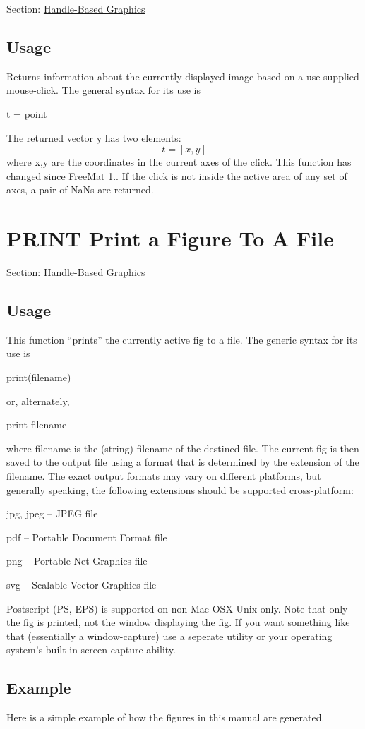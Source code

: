 Section\-: \hyperlink{sec_handle}{Handle-\/\-Based Graphics} \hypertarget{vtkwidgets_vtkxyplotwidget_Usage}{}\subsection{Usage}\label{vtkwidgets_vtkxyplotwidget_Usage}
Returns information about the currently displayed image based on a use supplied mouse-\/click. The general syntax for its use is \begin{DoxyVerb}   t = point
\end{DoxyVerb}
 The returned vector {\ttfamily y} has two elements\-: \[ t = [x,y] \] where {\ttfamily x,y} are the coordinates in the current axes of the click. This function has changed since Free\-Mat 1.. If the click is not inside the active area of any set of axes, a pair of Na\-Ns are returned. \hypertarget{handle_print}{}\section{P\-R\-I\-N\-T Print a Figure To A File}\label{handle_print}
Section\-: \hyperlink{sec_handle}{Handle-\/\-Based Graphics} \hypertarget{vtkwidgets_vtkxyplotwidget_Usage}{}\subsection{Usage}\label{vtkwidgets_vtkxyplotwidget_Usage}
This function ``prints'' the currently active fig to a file. The generic syntax for its use is \begin{DoxyVerb}  print(filename)
\end{DoxyVerb}
 or, alternately, \begin{DoxyVerb}  print filename
\end{DoxyVerb}
 where {\ttfamily filename} is the (string) filename of the destined file. The current fig is then saved to the output file using a format that is determined by the extension of the filename. The exact output formats may vary on different platforms, but generally speaking, the following extensions should be supported cross-\/platform\-: 
\begin{DoxyItemize}
\item {\ttfamily jpg}, {\ttfamily jpeg} -- J\-P\-E\-G file  
\item {\ttfamily pdf} -- Portable Document Format file  
\item {\ttfamily png} -- Portable Net Graphics file  
\item {\ttfamily svg} -- Scalable Vector Graphics file  
\end{DoxyItemize}Postscript (P\-S, E\-P\-S) is supported on non-\/\-Mac-\/\-O\-S\-X Unix only. Note that only the fig is printed, not the window displaying the fig. If you want something like that (essentially a window-\/capture) use a seperate utility or your operating system's built in screen capture ability. \hypertarget{variables_struct_Example}{}\subsection{Example}\label{variables_struct_Example}
Here is a simple example of how the figures in this manual are generated.


